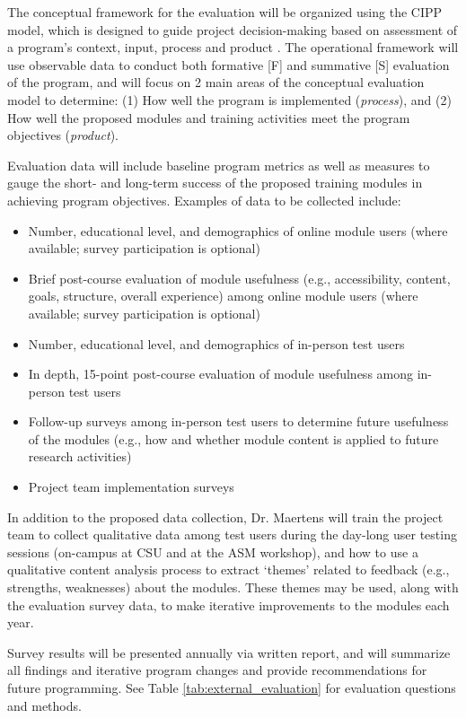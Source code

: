 \documentclass[pdftex,english,11pt,parskip=half]{scrartcl}
\begin{document}
The conceptual framework for the evaluation will be organized using the CIPP model, which is designed to guide project decision-making based on assessment of a program’s context, input, process and product \cite{stufflebeam2004cipp}. The operational framework will use observable data to conduct both formative [F] and summative [S] evaluation of the program, and will focus on 2 main areas of the conceptual evaluation model to determine: (1) How well the program is implemented (\textit{process}), and (2) How well the proposed modules and training activities meet the program objectives (\textit{product}).

Evaluation data will include baseline program metrics as well as measures to gauge the short- and long-term success of the proposed training modules in achieving program objectives. Examples of data to be collected include:

\begin{itemize}
\item Number, educational level, and demographics of online module users (where available; survey participation is optional)
\item Brief post-course evaluation of module usefulness (e.g., accessibility, content, goals, structure, overall experience) among online module users (where available; survey participation is optional)
\item Number, educational level, and demographics of in-person test users
\item In depth, 15-point post-course evaluation of module usefulness among in-person test users
\item Follow-up surveys among in-person test users to determine future usefulness of the modules (e.g., how and whether module content is applied to future research activities)
\item Project team implementation surveys
\end{itemize}

In addition to the proposed data collection, Dr. Maertens will train the project team to collect qualitative data among test users during the day-long user testing sessions (on-campus at CSU and at the ASM workshop), and how to use a qualitative content analysis process to extract ‘themes’ related to feedback (e.g., strengths, weaknesses) about the modules. These themes may be used, along with the evaluation survey data, to make iterative improvements to the modules each year.

Survey results will be presented annually via written report, and will summarize all findings and iterative program changes and provide recommendations for future programming. See Table \ref{tab:external_evaluation} for evaluation questions and methods.
\end{document}
